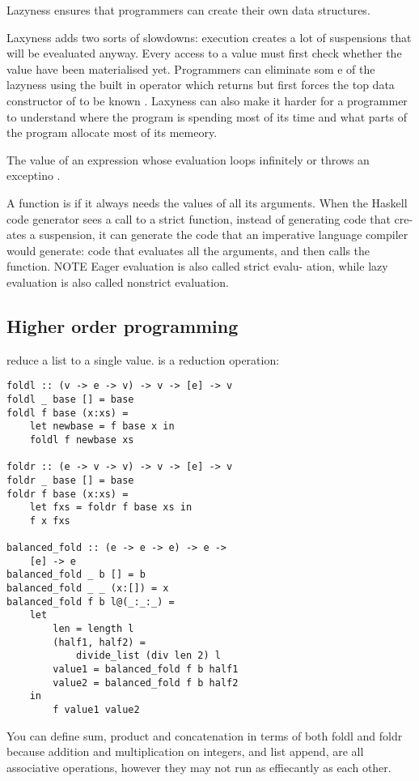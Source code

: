 \begin{compactitem}
\begin{lstlsiting}
\item Lazyness ensures that programmers can create their own data structures. 

\item Laxyness adds two sorts of slowdowns: execution creates a lot of suspensions that will be evealuated anyway. Every access to a value must first check whether the value have been materialised yet. Programmers can eliminate som e of the lazyness using the built in operator  which returns  but first forces the top data constructor of  to be known . Laxyness can also make it harder for a programmer to understand where the program is spending most of its time and what parts of the program allocate most of its memeory. 

\item The value of an expression whose evaluation loops infinitely or throws an exceptino .
\item A function is  if it always needs the values of
all its arguments. When the Haskell code generator sees a call to a
strict function, instead of generating code that cre-
ates a suspension, it can generate the code that an
imperative language compiler would generate: code
that evaluates all the arguments, and then calls the
function.
NOTE Eager evaluation is also called strict evalu-
ation, while lazy evaluation is also called nonstrict
evaluation.

\subsection{Higher order programming}
\item {} reduce a list to a single value.  is a reduction operation: 
\begin{lstlisting}
foldl :: (v -> e -> v) -> v -> [e] -> v
foldl _ base [] = base
foldl f base (x:xs) =
    let newbase = f base x in
    foldl f newbase xs

foldr :: (e -> v -> v) -> v -> [e] -> v
foldr _ base [] = base
foldr f base (x:xs) =
    let fxs = foldr f base xs in
    f x fxs
    
balanced_fold :: (e -> e -> e) -> e ->
    [e] -> e
balanced_fold _ b [] = b
balanced_fold _ _ (x:[]) = x
balanced_fold f b l@(_:_:_) =
    let
        len = length l
        (half1, half2) =
            divide_list (div len 2) l
        value1 = balanced_fold f b half1
        value2 = balanced_fold f b half2
    in
        f value1 value2
\end{lstlisting}
You can define sum, product and concatenation in
terms of both foldl and foldr because addition
and multiplication on integers, and list append, are
all associative operations, however they may not run as effiecantly as each other. 


\end{lstlsiting}
\end{compactitem}

